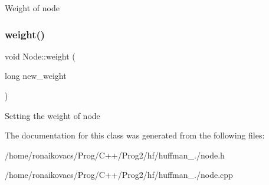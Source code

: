 Weight of node \mbox{\label{class_node_a33692230d8ddf48354a54c2d461243a4}} 
\subsubsection{\texorpdfstring{weight()}{weight()}\hspace{0.1cm}{\footnotesize\ttfamily [2/2]}}
{\footnotesize\ttfamily void Node\+::weight (\begin{DoxyParamCaption}\item[{long}]{new\+\_\+weight }\end{DoxyParamCaption})}

Setting the weight of node 

The documentation for this class was generated from the following files\+:\begin{DoxyCompactItemize}
\item 
/home/ronaikovacs/\+Prog/\+C++/\+Prog2/hf/huffman\+\_./node.\+h\item 
/home/ronaikovacs/\+Prog/\+C++/\+Prog2/hf/huffman\+\_./node.\+cpp\end{DoxyCompactItemize}
